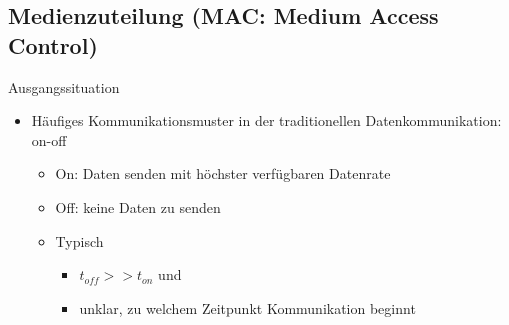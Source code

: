   \subsection{Medienzuteilung (MAC: Medium Access Control)}
    Ausgangssituation
    \begin{itemize}
      \item Häufiges Kommunikationsmuster in der traditionellen Datenkommunikation: on-off
        \begin{itemize}
          \item On: Daten senden mit höchster verfügbaren Datenrate
          \item Off: keine Daten zu senden
          \item Typisch
            \begin{itemize}
              \item $t_{off}>>t_{on}$ und
              \item unklar, zu welchem Zeitpunkt Kommunikation beginnt
            \end{itemize}
        \end{itemize}
    \end{itemize}
